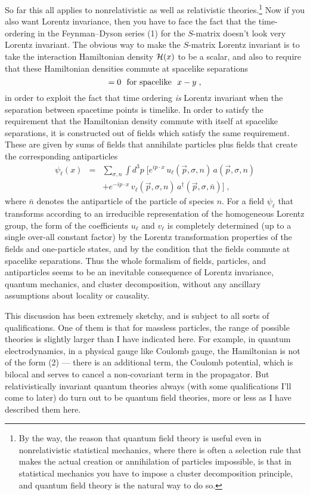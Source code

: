 \documentclass[12pt]{article}
\def\fnote#1#2{\begingroup\def\thefootnote{#1}\footnote{#2}
\endgroup}
\begin{document}
So far this all applies to nonrelativistic as well as
relativistic theories.\fnote{$\dagger$}{By the way, the reason
that
quantum field theory is useful even in nonrelativistic
statistical mechanics, where there is often a selection rule
that makes the actual creation or annihilation of particles
impossible, is that in statistical mechanics you have to
impose a cluster decomposition principle, and quantum field
theory is the natural way to do so.}  Now if you also want
Lorentz invariance, then you have to face the fact that the
time-ordering in the Feynman--Dyson series (1) for the
$S$-matrix doesn't look very Lorentz invariant.  The obvious
way
to make the $S$-matrix Lorentz invariant is to take the
interaction Hamiltonian density ${\cal H}(x)$ to be a
scalar, and also to require that these Hamiltonian densities
commute at spacelike separations
\begin{equation}
[{\cal H}(x),{\cal H}(y)]=0~~{\rm for~spacelike}~~x-y\;,
\end{equation}
in order to exploit the fact that time ordering {\em is}
Lorentz invariant when the separation between spacetime
points is timelike.  In order to satisfy the requirement
that the Hamiltonian density commute with itself at
spacelike separations, it is constructed out of fields which
satisfy the same requirement.  These are given by sums of
fields that annihilate particles plus fields that create the
corresponding antiparticles
\begin{eqnarray}
\psi_\ell(x)&=&\sum_{\sigma,n}\int d^3p\;\Bigg[
e^{ip\cdot x}\,u_\ell({\vec p},\sigma,n)\,a({\vec
p},\sigma,n)\nonumber\\&&+e^{-ip\cdot x}\,v_\ell({\vec
p},\sigma,n)\,a^\dagger({\vec p},\sigma,\bar{n})\Bigg]\;,
\end{eqnarray}
where $\bar{n}$ denotes the antiparticle of the particle of
species $n$.
For a field $\psi_\ell$ that transforms according to an
irreducible representation of the homogeneous Lorentz group,
the form of the coefficients $u_\ell$ and $v_\ell$
is completely determined (up to a single over-all constant
factor) by the Lorentz transformation properties of the
fields and one-particle states, and by the condition that
the fields commute at spacelike separations.
Thus the whole formalism of fields, particles, and
antiparticles seems to be an inevitable consequence of
Lorentz invariance, quantum mechanics, and cluster
decomposition, without any ancillary assumptions about
locality or causality.

This discussion has been extremely sketchy, and is subject
to all sorts of qualifications.  One of them is that for
massless particles, the range of possible theories is
slightly larger than I have indicated here.  For example, in
quantum electrodynamics, in a physical gauge like Coulomb
gauge, the Hamiltonian is not of the form (2) --- there is
an additional term, the Coulomb potential, which is  bilocal
and serves to cancel a non-covariant term in the propagator.
But relativistically invariant quantum theories always (with
some qualifications I'll come to later) do turn out to be
quantum field theories, more or less as I have described
them here.
\end{document}
